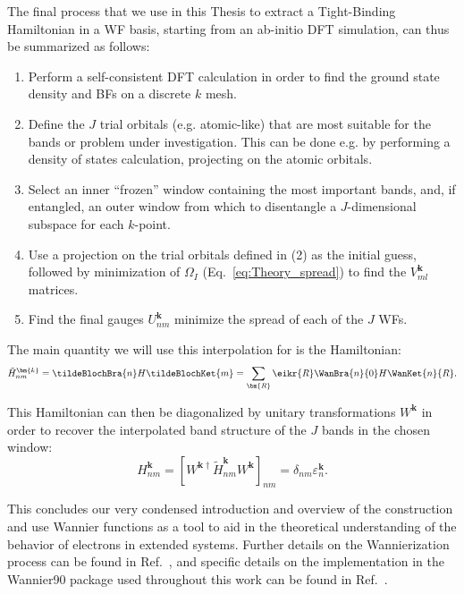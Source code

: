 The final process that we use in this Thesis to extract a Tight-Binding Hamiltonian in a \gls{WF} basis, starting from an ab-initio \gls{DFT} simulation, can thus be summarized as follows:
\begin{enumerate}
	\item Perform a self-consistent \gls{DFT} calculation in order to find the ground state density and \glspl{BF} on a discrete $k$ mesh.
	\item Define the $J$ trial orbitals (e.g. atomic-like) that are most suitable for the bands or problem under investigation. This can be done e.g. by performing a density of states calculation, projecting on the atomic orbitals.
	\item Select an inner ``frozen'' window containing the most important bands, and, if entangled, an outer window from which to disentangle a $J$-dimensional subspace for each $k$-point.
	\item Use a projection on the trial orbitals defined in (2) as the initial guess, followed by minimization of $\Omega_I$ (Eq.~\eqref{eq:Theory_spread}) to find the $V_{ml}^{\bm{k}}$ matrices.
	\item Find the final gauges $U_{nm}^{\bm{k}}$ minimize the spread of each of the $J$ \glspl{WF}.
\end{enumerate}

The main quantity we will use this interpolation for is the Hamiltonian:
\begin{equation}
	\label{eq:Theory_waninterp}
	\tilde{H}_{nm}^{\bm{k}} = \tildeBlochBra{n} H \tildeBlochKet{m} = \sum_{\bm{R}} \eikr{R} \WanBra{n}{0}H\WanKet{n}{R}.
\end{equation}

This Hamiltonian can then be diagonalized by unitary transformations $W^{\bm{k}}$ in order to recover the interpolated band structure of the $J$ bands in the chosen window:
\begin{equation}
H_{nm}^{\bm{k}} = [W^{\bm{k}\dagger} \tilde{H}_{nm}^{\bm{k}} W^{\bm{k}}]_{nm} = \delta_{nm} \varepsilon_{n}^{\bm{k}}.
\end{equation}

This concludes our very condensed introduction and overview of the construction and use Wannier functions as a tool to aid in the theoretical understanding of the behavior of electrons in extended systems.
Further details on the Wannierization process can be found in Ref.~\cite{Marzari2012}, and specific details on the implementation in the Wannier90 package used throughout this work can be found in Ref.~\cite{Mostofi2014AnFunctions}.

